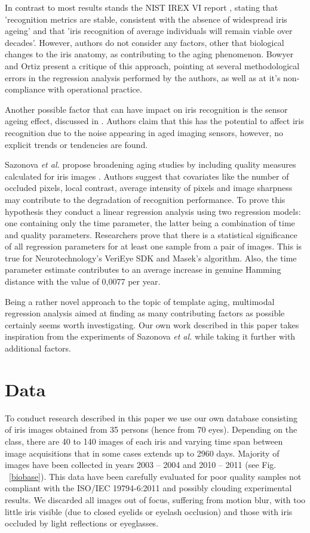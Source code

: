 \documentclass{article}
\begin{document}
In contrast to most results stands the NIST IREX VI report \cite{IREX}, stating that 'recognition metrics are stable, consistent with the absence of widespread iris ageing' and that 'iris recognition of average individuals will remain viable over decades'. However, authors do not consider any factors, other that biological changes to the iris anatomy, as contributing to the aging phenomenon. Bowyer and Ortiz \cite{BowyerIREX} present a critique of this approach, pointing at several methodological errors in the regression analysis performed by the authors, as well as at it's non-compliance with operational practice.

Another possible factor that can have impact on iris recognition is the sensor ageing effect, discussed in \cite{sensor}. Authors claim that this has the potential to affect iris recognition due to the noise appearing in aged imaging sensors, however, no explicit trends or tendencies are found. 

Sazonova \emph{et al.} propose broadening aging studies by including quality measures calculated for iris images \cite{Sazonova}. Authors suggest that covariates like the number of occluded pixels, local contrast, average intensity of pixels and image sharpness may contribute to the degradation of recognition performance. To prove this hypothesis they conduct a linear regression analysis using two regression models: one containing only the time parameter, the latter being a combination of time and quality parameters. Researchers prove that there is a statistical significance of all regression parameters for at least one sample from a pair of images. This is true for Neurotechnology's VeriEye SDK and Masek's algorithm. Also, the time parameter estimate contributes to an average increase in genuine Hamming distance with the value of 0,0077 per year.

Being a rather novel approach to the topic of template aging, multimodal regression analysis aimed at finding as many contributing factors as possible certainly seems worth investigating. Our own work described in this paper takes inspiration from the experiments of Sazonova \emph{et al.} while taking it further with additional factors.

\section{Data}
\label{sec:data}

To conduct research described in this paper we use our own database consisting of iris images obtained from 35 persons (hence from 70 eyes). Depending on the class, there are 40 to 140 images of each iris and varying time span between image acquisitions that in some cases extends up to 2960 days. Majority of images have been collected in years 2003 -- 2004 and 2010 -- 2011 (see Fig. ~\ref{biobase}). This data have been carefully evaluated for poor quality samples not compliant with the ISO/IEC 19794-6:2011 \cite{ISO} and possibly clouding experimental results. We discarded all images out of focus, suffering from motion blur, with too little iris visible (due to closed eyelids or eyelash occlusion) and those with iris occluded by light reflections or eyeglasses.
\end{document}
